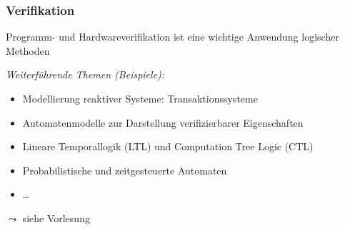 \documentclass[aspectratio=1610,onlymath]{beamer}
\begin{document}
\begin{frame}\frametitle{Verifikation}

Programm- und Hardwareverifikation ist eine wichtige Anwendung logischer Methoden
\bigskip

\emph{Weiterführende Themen (Beispiele):}
\begin{itemize}
\item Modellierung reaktiver Systeme: Transaktionssysteme
\item Automatenmodelle zur Darstellung verifizierbarer Eigenschaften
\item Lineare Temporallogik (LTL) und Computation Tree Logic (CTL)
\item Probabilistische und zeitgesteuerte Automaten
\item \ldots
\end{itemize}

$\leadsto$ siehe Vorlesung 

\end{frame}

% 
% 
% 
% 
% 
% 
% 
\end{document}
